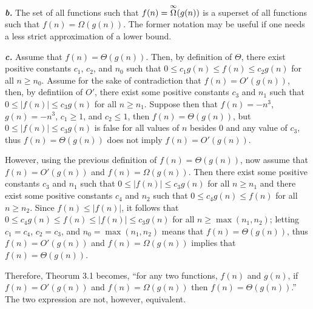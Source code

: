 \documentclass{article}
\begin{document}
\noindent\textbf{\textit{b.}} The set of all functions such that $f(n) = \overset{\small\infty}{\Omega}(g(n))$ is a superset of all functions such that $f(n) = \Omega(g(n))$. The former notation may be useful if one needs a less strict approximation of a lower bound.

\noindent\textbf{\textit{c.}} Assume that $f(n) = \Theta(g(n))$. Then, by definition of $\Theta$, there exist positive constants $c_1$, $c_2$, and $n_0$ such that $0 \leq c_1 g(n) \leq f(n) \leq c_2 g(n)$ for all $n \geq n_0$. Assume for the sake of contradiction that $f(n) = O'(g(n))$, then, by defintiion of $O'$, there exist some positive constants $c_3$ and $n_1$ such that $0 \leq | f(n) | \leq c_3 g(n)$ for all $n \geq n_1$. Suppose then that $f(n) = -n^3$, $g(n) = -n^3$, $c_1 \geq 1$, and $c_2 \leq 1$, then $f(n) = \Theta(g(n))$, but $0 \leq | f(n) | \leq c_3 g(n)$ is false for all values of $n$ besides $0$ and any value of $c_3$, thus $f(n) = \Theta(g(n))$ does not imply $f(n) = O'(g(n))$.

However, using the previous definition of $f(n) = \Theta(g(n))$, now assume that $f(n) = O'(g(n))$ and $f(n) = \Omega(g(n))$. Then there exist some positive constants $c_3$ and $n_1$ such that $0 \leq | f(n) | \leq c_3 g(n)$ for all $n \geq n_1$ and there exist some positive constants $c_4$ and $n_2$ such that $0 \leq c_4 g(n) \leq f(n)$ for all $n \geq n_2$. Since $f(n) \leq | f(n) |$, it follows that $0 \leq c_4 g(n) \leq f(n) \leq | f(n) | \leq c_3 g(n)$ for all $n \geq \max(n_1, n_2)$; letting $c_1 = c_4$, $c_2 = c_3$, and $n_0 = \max(n_1, n_2)$ means that $f(n) = \Theta(g(n))$, thus $f(n) = O'(g(n))$ and $f(n) = \Omega(g(n))$ implies that $f(n) = \Theta(g(n))$.

Therefore, Theorum 3.1 becomes, ``for any two functions, $f(n)$ and $g(n)$, if $f(n) = O'(g(n))$ and $f(n) = \Omega(g(n))$ then $f(n) = \Theta(g(n))$.'' The two expression are not, however, equivalent.
\end{document}
